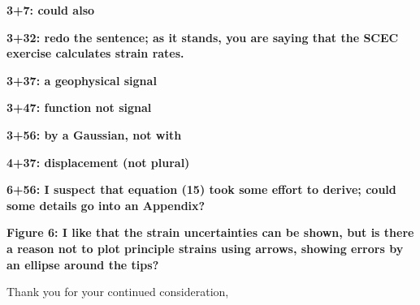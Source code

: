 \documentclass[10pt,a4paper]{letter}
\begin{document}
\begin{letter}{}
\textbf{3+7: could also}

\textbf{3+32: redo the sentence; as it stands, you are saying that the SCEC
exercise calculates strain rates.}

\textbf{3+37: a geophysical signal}

\textbf{3+47: function not signal}

\textbf{3+56: by a Gaussian, not with}

\textbf{4+37: displacement (not plural)}

\textbf{6+56: I suspect that equation (15) took some effort to derive; could
some details go into an Appendix?}

\textbf{Figure 6: I like that the strain uncertainties can be shown, but is
there a reason not to plot principle strains using arrows, showing
errors by an ellipse around the tips?}

\closing{Thank you for your continued consideration,}

\end{letter}
\end{document}
